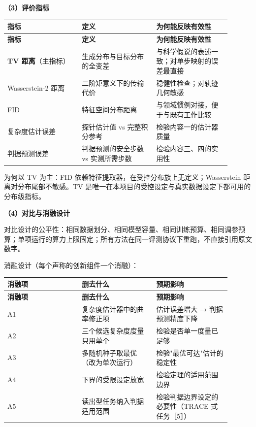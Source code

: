 \documentclass[12pt,a4paper]{ctexart}
\begin{document}
\textbf{（3）评价指标}

\begin{longtable}{|>{\raggedright\arraybackslash}p{0.300\linewidth}|>{\raggedright\arraybackslash}p{0.300\linewidth}|>{\raggedright\arraybackslash}p{0.300\linewidth}|}
\hline
\textbf{指标} & \textbf{定义} & \textbf{为何能反映有效性} \\
\hline
\endfirsthead
\hline
\textbf{指标} & \textbf{定义} & \textbf{为何能反映有效性} \\
\hline
\endhead
\textbf{TV 距离}（主指标） & 生成分布与目标分布的全变差 & 与科学假说的表述一致；对单步映射的误差最直接 \\
\hline
Wasserstein-2 距离 & 二阶矩意义下的传输代价 & 稳健性检查；对轨迹几何敏感 \\
\hline
FID & 特征空间分布距离 & 与领域惯例对接，便于与既有工作比较 \\
\hline
复杂度估计误差 & 探针估计值 vs 完整积分参考 & 检验内容一的估计器质量 \\
\hline
判据预测误差 & 判据预测的安全步数 vs 实测所需步数 & 检验内容三、四的实用性 \\
\hline
\end{longtable}

为何以 TV 为主：FID 依赖特征提取器，在受控分布族上无定义；Wasserstein 距离对分布尾部不敏感。TV 是唯一在本项目的受控设定与真实数据设定下都可用的分布级指标。

\textbf{（4）对比与消融设计}

对比设计的公平性：相同数据划分、相同模型容量、相同训练预算、相同调参预算；单项运行的算力上限固定；所有方法在同一评测协议下重跑，不直接引用原文数字。

消融设计（每个声称的创新组件一个消融）：

\begin{longtable}{|>{\raggedright\arraybackslash}p{0.300\linewidth}|>{\raggedright\arraybackslash}p{0.300\linewidth}|>{\raggedright\arraybackslash}p{0.300\linewidth}|}
\hline
\textbf{消融项} & \textbf{删去什么} & \textbf{预期影响} \\
\hline
\endfirsthead
\hline
\textbf{消融项} & \textbf{删去什么} & \textbf{预期影响} \\
\hline
\endhead
A1 & 复杂度估计器中的曲率修正项 & 估计误差增大 → 判据预测精度下降 \\
\hline
A2 & 三个候选复杂度度量只用单个 & 检验是否单一度量已足够 \\
\hline
A3 & 多随机种子取最优（改为单次运行） & 检验"最优可达"估计的稳定性 \\
\hline
A4 & 下界的受限设定放宽 & 检验定理的适用范围边界 \\
\hline
A5 & 读出型任务纳入判据适用范围 & 检验判据边界设定的必要性（TRACE 式任务［5］） \\
\hline
\end{longtable}
\end{document}
